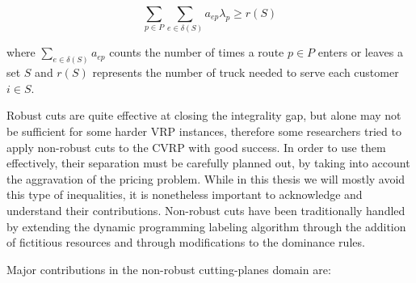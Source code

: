 \begin{equation}
	\sum_{p \in P} \sum_{e \in \delta(S)}  a_{ep} \lambda_p \ge r(S)
\end{equation}


where $\sum_{e \in \delta(S)} a_{ep}$ counts the number of times a route $p \in P$
enters or leaves a set $S$ and $r(S)$ represents the number of truck needed
to serve each customer $i \in S$.


\medskip

Robust cuts are quite effective at closing the integrality gap, but alone may not
be sufficient for some harder VRP instances,
therefore some researchers tried to apply non-robust cuts to the CVRP with good success.
In order to use them effectively, their separation must be carefully
planned out, by taking into account the aggravation of the pricing problem.
While in this thesis we will mostly avoid this type of inequalities,
it is nonetheless important to acknowledge and understand their contributions.
Non-robust cuts have been traditionally handled by extending the
dynamic programming labeling algorithm
through the addition of fictitious resources and through modifications to the dominance rules.

\medskip

Major contributions in the non-robust cutting-planes domain are:

